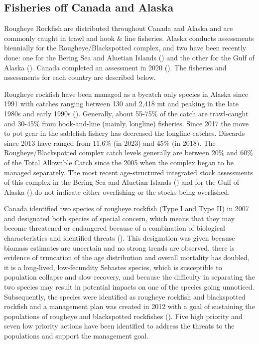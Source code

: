 \documentclass[
]{scrartcl}
\begin{document}
\subsection{Fisheries off Canada and
Alaska}\label{fisheries-off-canada-and-alaska}

Rougheye Rockfish are distributed throughout Canada and Alaska and are
commonly caught in trawl and hook \& line fisheries. Alaska conducts
assessments biennially for the Rougheye/Blackspotted complex, and two
have been recently done: one for the Bering Sea and Aluetian Islands
() and the other for the Gulf of Alaska
(). Canada
completed an assessment in 2020
().
The fisheries and assessments for each country are described below.

Rougheye rockfish have been managed as a bycatch only species in Alaska
since 1991 with catches ranging between 130 and 2,418 mt and peaking in
the late 1980s and early 1990s
().
Generally, about 55-75\% of the catch are trawl-caught and 30-45\% from
hook-and-line (mainly, longline) fisheries. Since 2017 the move to pot
gear in the sablefish fishery has decreased the longline catches.
Discards since 2013 have ranged from 11.6\% (in 2023) and 45\% (in
2018). The Rougheye/Blackspotted complex catch levels generally are
between 20\% and 60\% of the Total Allowable Catch since the 2005 when
the complex began to be managed separately. The most recent
age-structured integrated stock assessments of this complex in the
Bering Sea and Aluetian Islands
() and for the Gulf of Alaska
() do not
indicate either overfishing or the stocks being overfished.

Canada identified two species of rougheye rockfish (Type I and Type II)
in 2007 and designated both species of special concern, which means that
they may become threatened or endangered because of a combination of
biological characteristics and identified threats
(). This designation was given
because biomass estimates are uncertain and no strong trends are
observed, there is evidence of truncation of the age distribution and
overall mortality has doubled, it is a long-lived, low-fecundity
Sebastes species, which is susceptible to population collapse and slow
recovery, and because the difficulty in separating the two species may
result in potential impacts on one of the species going unnoticed.
Subsequently, the species were identified as rougheye rockfish and
blackspotted rockfish and a management plan was created in 2012 with a
goal of sustaining the populations of rougheye and blackspotted
rockfishes
(). Five high priority and seven low priority actions have been
identified to address the threats to the populations and support the
management goal.
\end{document}
